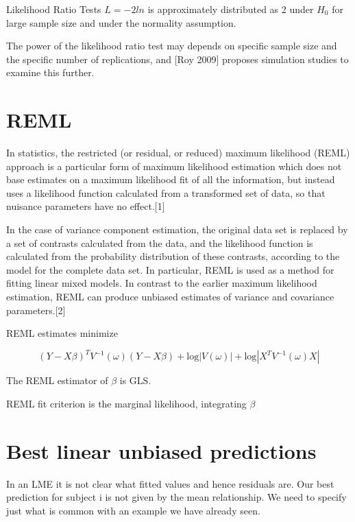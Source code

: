 \documentclass[Main.tex]{subfiles}
\begin{document}
Likelihood Ratio Tests
$L= - 2ln$ is approximately distributed as 2 under $H_0$ for large sample size and under the normality assumption.

The power of the likelihood ratio test may depends on specific sample size and the specific number of replications, and [Roy 2009] proposes simulation studies to examine this further.

\section{REML}

In statistics, the restricted (or residual, or reduced) maximum likelihood (REML) approach is a particular form of maximum likelihood estimation which does not base estimates on a maximum likelihood fit of all the information, but instead uses a likelihood function calculated from a transformed set of data, so that nuisance parameters have no effect.[1]

In the case of variance component estimation, the original data set is replaced by a set of contrasts calculated from the data, and the likelihood function is calculated from the probability distribution of these contrasts, according to the model for the complete data set. In particular, REML is used as a method for fitting linear mixed models. In contrast to the earlier maximum likelihood estimation, REML can produce unbiased estimates of variance and covariance parameters.[2]



REML estimates minimize

\[ (Y-X\beta)^{T}V^{-1}(\omega)(Y-X\beta) + \mbox{log}|V(\omega)|
+ \mbox{log}|X^{T}V^{-1}(\omega)X| \]

The REML estimator of $\beta$ is GLS.

REML fit criterion is the marginal likelihood, integrating $\beta$


\section{Best linear unbiased predictions}
In an LME it is not clear what ﬁtted values and hence residuals are.
Our best prediction for subject i is not given by the mean relationship. We need to specify just what is
common with an example we have already seen.
\end{document}
